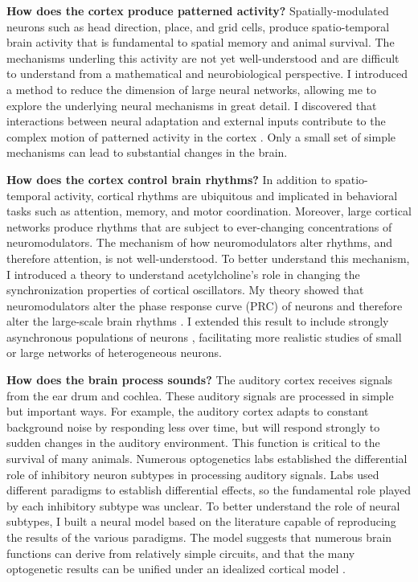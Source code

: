 \documentclass[a4paper,11pt]{article}
\begin{document}
\textbf{How does the cortex produce patterned activity?} Spatially-modulated neurons such as head direction, place, and grid cells, produce spatio-temporal brain activity that is fundamental to spatial memory and animal survival. The mechanisms underling this activity are not yet well-understood and are difficult to understand from a mathematical and neurobiological perspective. I introduced a method to reduce the dimension of large neural networks, allowing me to explore the underlying neural mechanisms in great detail. I discovered that interactions between neural adaptation and external inputs contribute to the complex motion of patterned activity in the cortex \cite{park2018scalar}. Only a small set of simple mechanisms can lead to substantial changes in the brain.

\textbf{How does the cortex control brain rhythms?} In addition to spatio-temporal activity, cortical rhythms are ubiquitous and implicated in behavioral tasks such as attention, memory, and motor coordination. Moreover, large cortical networks produce rhythms that are subject to ever-changing concentrations of neuromodulators. The mechanism of how neuromodulators alter rhythms, and therefore attention, is not well-understood. To better understand this mechanism, I introduced a theory to understand acetylcholine's role in changing the synchronization properties of cortical oscillators. My theory showed that neuromodulators alter the phase response curve (PRC) of neurons and therefore alter the large-scale brain rhythms \cite{park2016weakly}. I extended this result to include strongly asynchronous populations of neurons \cite{park2018multiple}, facilitating more realistic studies of small or large networks of heterogeneous neurons.

\textbf{How does the brain process sounds?} The auditory cortex receives signals from the ear drum and cochlea. These auditory signals are processed in simple but important ways. For example, the auditory cortex adapts to constant background noise by responding less over time, but will respond strongly to sudden changes in the auditory environment. This function is critical to the survival of many animals. Numerous optogenetics labs established the differential role of inhibitory neuron subtypes in processing auditory signals. Labs used different paradigms to establish differential effects, so the fundamental role played by each inhibitory subtype was unclear. To better understand the role of neural subtypes, I built a neural model based on the literature capable of reproducing the results of the various paradigms. The model suggests that numerous brain functions can derive from relatively simple circuits, and that the many optogenetic results can be unified under an idealized cortical model \cite{park2020circuit}.
\end{document}
